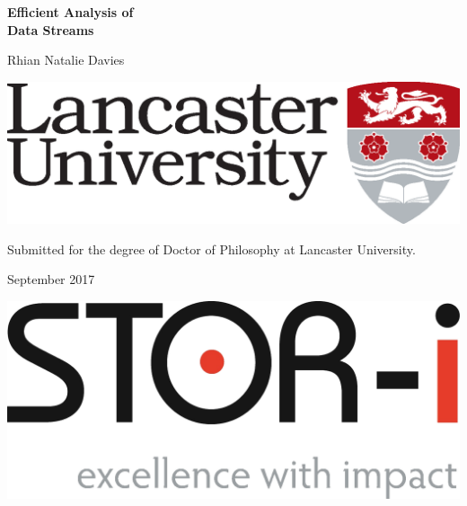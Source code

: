 \documentclass[12pt, a4]{report}
\begin{document}
     
          
\thispagestyle{empty}
\begin{center}   
\begin{minipage}{0.75\linewidth}                                                    
    \centering      
    \vspace{2cm}  
  \Huge\textbf{Efficient Analysis of \\ Data Streams}\par 
    {\Large Rhian Natalie Davies\par}
    \vspace{2cm}
    \begin{center}   
    \includegraphics[width=0.6\linewidth]{figures/LU}                  
    \end{center}    
    \vspace{1cm}
    {\Large Submitted for the degree of Doctor of Philosophy at Lancaster University.\par}
    \vspace{1cm}
    {\Large September 2017}
\end{minipage}
\end{center}   

\vfill       
\hfill 
\begin{minipage}{.45\linewidth}  
\begin{flushright}                                      
\includegraphics[width=0.6\linewidth]{figures/stori.png}
\end{flushright} 
\end{minipage}  

\clearpage

\pagestyle{plain}

\setpagewiselinenumbers
 
\modulolinenumbers[1]
\thispagestyle{empty}
\end{document}
